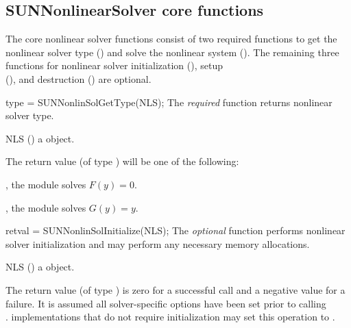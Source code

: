 \subsection{SUNNonlinearSolver core functions}
\label{ss:sunnonlinsol_corefn}
The core nonlinear solver functions consist of two required functions to get the
nonlinear solver type () and solve the nonlinear system
(). The remaining three functions for nonlinear solver
initialization (), setup\\ \noindent
(), and destruction () are optional.

{
  type = SUNNonlinSolGetType(NLS);
}
{
  The \textit{required} function  returns
  nonlinear solver type.
}
{
  \begin{args}[NLS]
  \item[NLS] ()
    a {\sunnonlinsol} object.
  \end{args}
}
{
  The return value  (of type ) will be one of the
  following:
  \begin{args}
  \item[\Id{SUNNONLINEARSOLVER\_ROOTFIND}]
    , the {\sunnonlinsol} module solves $F(y) = 0$.
  \item[\Id{SUNNONLINEARSOLVER\_FIXEDPOINT}]
    , the {\sunnonlinsol} module solves $G(y) = y$.
  \end{args}
}
{}
{
  retval = SUNNonlinSolInitialize(NLS);
}
{
  The \textit{optional} function  performs
  nonlinear solver initialization and may perform any necessary memory
  allocations.
}
{
  \begin{args}[NLS]
  \item[NLS] ()
    a {\sunnonlinsol} object.
  \end{args}
}
{
  The return value  (of type ) is zero for a
  successful call and a negative value for a failure.
}
{
  It is assumed all solver-specific options have been set prior to
  calling \\ \noindent
  . {\sunnonlinsol} implementations
  that do not require initialization may set this operation
  to .
}

